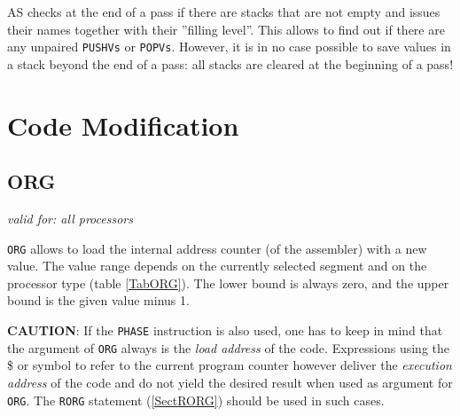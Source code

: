 \documentclass[12pt,twoside]{report}
\makeatletter
\newcommand{\tty}[1]{{\tt #1}}
\newcommand{\ttindex}[1]{\index{#1@{\tt #1}}}
\makeatother
\begin{document}
AS checks at the end of a pass if there are stacks that are not empty and
issues their names together with their ''filling level''.  This allows to
find out if there are any unpaired \tty{PUSHVs} or \tty{POPVs}.  However,
it is in no case possible to save values in a stack beyond the end of a
pass: all stacks are cleared at the beginning of a pass!


\section{Code Modification}


\subsection{ORG}
\label{SectORG}
\ttindex{ORG}

{\em valid for: all processors}

\tty{ORG} allows to load the internal address counter (of the assembler)
with a new value. The value range depends on the currently selected
segment and on the processor type (table \ref{TabORG}).
The lower bound is always zero, and the upper bound is the given value
minus 1.
\par
{\bf CAUTION}: If the \tty{PHASE} instruction is also used, one
has to keep in mind that the argument of \tty{ORG} always is the
{\em load address} of the code.  Expressions using the \$ or \*
symbol to refer to the current program counter however deliver
the {\em execution address} of the code and do not yield the
desired result when used as argument for \tty{ORG}.  The
\tty{RORG} statement (\ref{SectRORG}) should be used in such cases.
\end{document}
